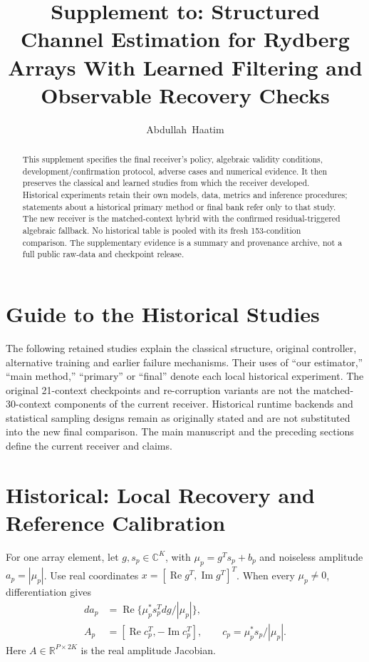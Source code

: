 \documentclass[journal]{IEEEtran}
\newcommand{\R}{\mathbb R}
\begin{document}
\title{Supplement to: Structured Channel Estimation for Rydberg Arrays With Learned Filtering and Observable Recovery Checks}
\author{Abdullah~Haatim}
\maketitle
\begin{abstract}
This supplement specifies the final receiver's policy, algebraic validity conditions, development/confirmation protocol, adverse cases and numerical evidence. It then preserves the classical and learned studies from which the receiver developed. Historical experiments retain their own models, data, metrics and inference procedures; statements about a historical primary method or final bank refer only to that study. The new receiver is the matched-context hybrid with the confirmed residual-triggered algebraic fallback. No historical table is pooled with its fresh 153-condition comparison. The supplementary evidence is a summary and provenance archive, not a full public raw-data and checkpoint release.
\end{abstract}


\clearpage
\section{Guide to the Historical Studies}
The following retained studies explain the classical structure, original controller, alternative training and earlier failure mechanisms. Their uses of ``our estimator,'' ``main method,'' ``primary'' or ``final'' denote each local historical experiment. The original 21-context checkpoints and re-corruption variants are not the matched-30-context components of the current receiver. Historical runtime backends and statistical sampling designs remain as originally stated and are not substituted into the new final comparison. The main manuscript and the preceding sections define the current receiver and claims.











\section{Historical: Local Recovery and Reference Calibration}
For one array element, let $g,s_p\in\mathbb C^K$, with
$\mu_p=g^Ts_p+b_p$ and noiseless amplitude $a_p=|\mu_p|$.
Use real coordinates $x=[\operatorname{Re}g^T,\operatorname{Im}g^T]^T$.
When every $\mu_p\ne0$, differentiation gives
\begin{align}
 da_p&=\operatorname{Re}\{\mu_p^*s_p^T dg/|\mu_p|\},\\
 A_p&=[\operatorname{Re}c_p^T,-\operatorname{Im}c_p^T],\qquad
 c_p=\mu_p^*s_p/|\mu_p|.
\end{align}
Here $A\in\R^{P\times2K}$ is the real amplitude Jacobian.
\end{document}
